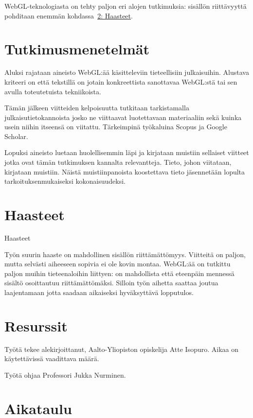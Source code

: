 \documentclass[12pt,a4paper,finnish,oneside]{article}
\begin{document}
WebGL-teknologiasta on tehty paljon eri alojen tutkimuksia: sisällön riittävyyttä pohditaan enemmän kohdassa~\hyperlink{sec:haasteet}{\ref{sec:haasteet}: Haasteet}.

\section{Tutkimusmenetelmät}

Aluksi rajataan aineisto WebGL:ää käsitteleviin tieteellisiin julkaisuihin. Alustava kriteeri on että tekstillä on jotain konkreettista sanottavaa WebGL:stä tai sen avulla toteutetuista tekniikoista.

Tämän jälkeen viitteiden kelpoisuutta tutkitaan tarkistamalla julkaisutietokannoista josko ne viittaavat luotettavaan materiaaliin sekä kuinka usein niihin itseensä on viitattu. Tärkeimpinä työkaluina Scopus ja Google Scholar.

Lopuksi aineisto luetaan huolellisemmin läpi ja kirjataan muistiin sellaiset viitteet jotka ovat tämän tutkimuksen kannalta relevantteja. Tieto, johon viitataan, kirjataan muistiin. Näistä muistiinpanoista koostettava tieto jäsennetään lopulta tarkoituksenmukaiseksi kokonaisuudeksi.

\section{Haasteet}
\label{sec:haasteet}
\hypertarget{sec:haasteet}{Haasteet}

Työn suurin haaste on mahdollinen sisällön riittämättömyys. Viitteitä on paljon, mutta selvästi aiheeseen sopivia ei ole kovin montaa. WebGL:ää on tutkittu paljon muihin tieteenaloihin liittyen: on mahdollista että eteenpäin mennessä sisältö osoittautuu riittämättömäksi. Silloin työn aihetta saattaa joutua laajentamaan jotta saadaan aikaiseksi hyväksyttävä lopputulos.

\section{Resurssit}

Työtä tekee alekirjoittanut, Aalto-Yliopiston opiskelija Atte Isopuro. Aikaa on käytettävissä vaadittava määrä.

Työtä ohjaa Professori Jukka Nurminen.

\section{Aikataulu}
\end{document}
